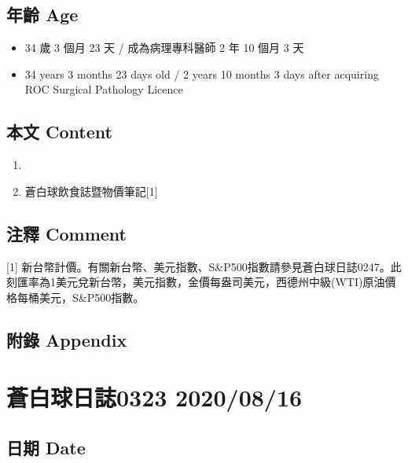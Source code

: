 \documentclass[a5paper, 11pt
]{book}
\providecommand{\tightlist}{%
  \setlength{\itemsep}{0pt}\setlength{\parskip}{0pt}}
\begin{document}
\hypertarget{ux5e74ux9f61-age-75}{%
\subsection{年齡 Age}\label{ux5e74ux9f61-age-75}}

\begin{itemize}
\tightlist
\item
  34 歲 3 個月 23 天 / 成為病理專科醫師 2 年 10 個月 3 天
\item
  34 years 3 months 23 days old / 2 years 10 months 3 days after
  acquiring ROC Surgical Pathology Licence
\end{itemize}

\hypertarget{ux672cux6587-content-75}{%
\subsection{本文 Content}\label{ux672cux6587-content-75}}

\begin{enumerate}
\def\labelenumi{\arabic{enumi}.}
\tightlist
\item
\item
  蒼白球飲食誌暨物價筆記{[}1{]}
\end{enumerate}

\hypertarget{ux6ce8ux91cb-comment-75}{%
\subsection{注釋 Comment}\label{ux6ce8ux91cb-comment-75}}

{[}1{]}
新台幣計價。有關新台幣、美元指數、S\&P500指數請參見蒼白球日誌0247。此刻匯率為1美元兌新台幣，美元指數，金價每盎司美元，西德州中級(WTI)原油價格每桶美元，S\&P500指數。

\hypertarget{ux9644ux9304-appendix-75}{%
\subsection{附錄 Appendix}\label{ux9644ux9304-appendix-75}}

\hypertarget{ux84bcux767dux7403ux65e5ux8a8c0323-20200816}{%
\section{蒼白球日誌0323
2020/08/16}\label{ux84bcux767dux7403ux65e5ux8a8c0323-20200816}}

\hypertarget{ux65e5ux671f-date-76}{%
\subsection{日期 Date}\label{ux65e5ux671f-date-76}}
\end{document}
